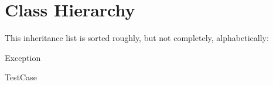 \section{Class Hierarchy}
This inheritance list is sorted roughly, but not completely, alphabetically\+:\begin{DoxyCompactList}
\item Exception\begin{DoxyCompactList}
\item {}
\end{DoxyCompactList}
\item Test\+Case\begin{DoxyCompactList}
\item {}
\end{DoxyCompactList}
\end{DoxyCompactList}
